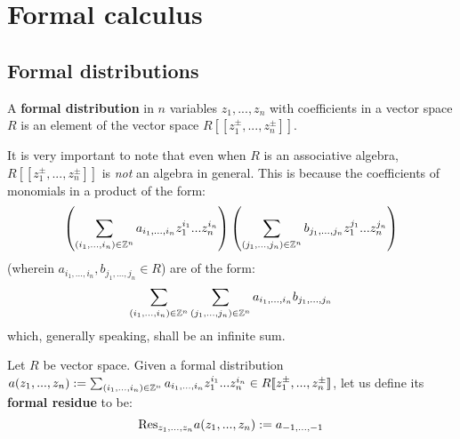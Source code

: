 \section{Formal calculus}
    \subsection{Formal distributions}
        \begin{definition} \label{def: formal_distributions}
            A \textbf{formal distribution} in $n$ variables $z_1, ..., z_n$ with coefficients in a vector space $R$ is an element of the vector space $R[\![z_1^{\pm}, ..., z_n^{\pm}]\!]$.
        \end{definition}
        It is very important to note that even when $R$ is an associative algebra, $R[\![z_1^{\pm}, ..., z_n^{\pm}]\!]$ is \textit{not} an algebra in general. This is because the coefficients of monomials in a product of the form:
            $$\left( \sum_{(i_1, ..., i_n) \in \mathbb{Z}^n} a_{i_1, ..., i_n} z_1^{i_1} ... z_n^{i_n} \right) \left( \sum_{(j_1, ..., j_n) \in \mathbb{Z}^n} b_{j_1, ..., j_n} z_1^{j_1} ... z_n^{j_n} \right)$$
        (wherein $a_{i_1, ..., i_n}, b_{j_1, ..., j_n} \in R$) are of the form:
            $$\sum_{(i_1, ..., i_n) \in \mathbb{Z}^n} \sum_{(j_1, ..., j_n) \in \mathbb{Z}^n} a_{i_1, ..., i_n} b_{j_1, ..., j_n}$$
        which, generally speaking, shall be an infinite sum.

        \begin{definition} \label{def: formal_residues}
            Let $R$ be vector space. Given a formal distribution $a(z_1, ..., z_n) := \sum_{(i_1, ..., i_n) \in \mathbb{Z}^n} a_{i_1, ..., i_n} z_1^{i_1} ... z_n^{i_n} \in R[\![z_1^{\pm}, ..., z_n^{\pm}]\!]$, let us define its \textbf{formal residue} to be:
                $$\mathrm{Res}_{z_1, ..., z_n} a(z_1, ..., z_n) := a_{-1, ..., -1}$$
        \end{definition}
        
